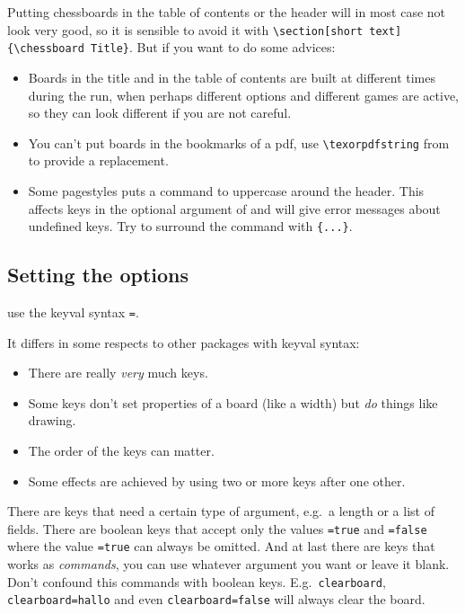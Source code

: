 \documentclass[pagesize,parskip=half-,fontsize=12pt]{scrartcl}
\begin{document}
Putting chessboards in the table of contents or the header will in
most case not look very good, so it is sensible to avoid it with
\lstinline+\section[short text]{\chessboard Title}+.
But if you want to do some advices:
\begin{itemize}
\item
Boards in the title and in the table of contents are built at different times during the run, when perhaps
different options and different games are active, so they can look
different if you are not careful.
\item You can't put boards in the bookmarks of a pdf, use
\verb+\texorpdfstring+ from  to provide a
replacement.
\item Some pagestyles puts a command to uppercase around the header.
This affects keys in the optional argument of  and
will give error messages about undefined keys. Try to surround the
 command with \verb+{...}+.
\end{itemize}



\subsection{Setting the options}

\Pchessboard use the keyval syntax \texttt{=}.

It differs in some respects to other packages with keyval syntax:
\mynobreakpar
\begin{itemize}
\item
There are really \emph{very} much keys.
\item
Some keys don't set properties of a board (like a width) but
\emph{do} things like drawing.
\item
The order of the keys can matter.
\item
Some effects are achieved by using two or more keys after one other.
\end{itemize}

There are keys that need a certain type of argument, e.g.\ a length
or a list of fields.  There are boolean keys that accept only the
values \texttt{=true} and \texttt{=false} where the value
\texttt{=true} can always be omitted. And at last there are keys
that works as \emph{commands}, you can use whatever argument you want
or leave it blank. Don't confound this commands with boolean keys.
E.g.\
\texttt{clearboard}, \texttt{clearboard=hallo} and even
\texttt{clearboard=false} will always clear the board.
\end{document}
